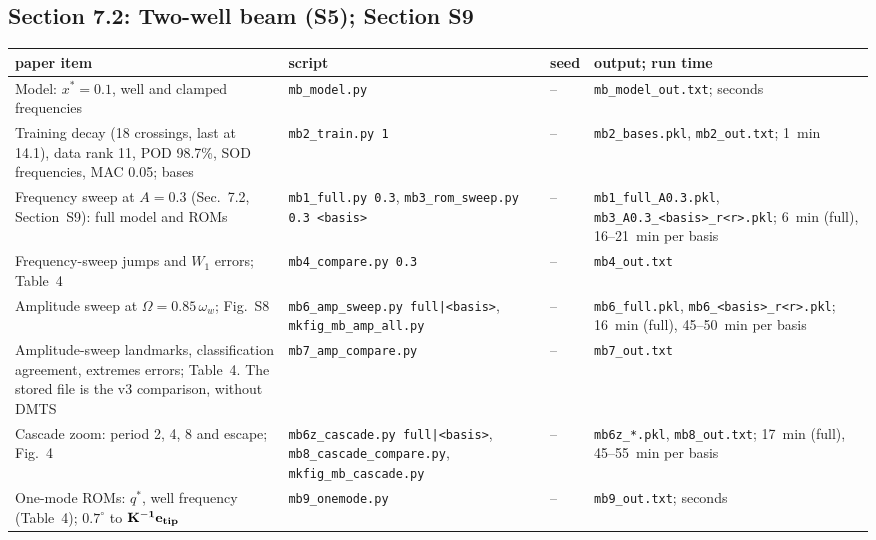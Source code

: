 \documentclass[10pt]{article}
\newcommand{\f}[1]{\texttt{#1}}
\begin{document}
\subsection*{Section 7.2: Two-well beam (S5); Section S9}
\begin{longtable}{L{0.31\textwidth}L{0.25\textwidth}L{0.08\textwidth}L{0.25\textwidth}}
\toprule
paper item & script & seed & output; run time\\ \midrule
Model: $x^*=0.1$, well and clamped frequencies & \f{mb\_\allowbreak{}model.py} & -- & \f{mb\_\allowbreak{}model\_\allowbreak{}out.txt}; seconds\\
Training decay (18 crossings, last at 14.1), data rank 11, POD 98.7\%, SOD frequencies, MAC 0.05; bases & \f{mb2\_\allowbreak{}train.py 1} & -- & \f{mb2\_\allowbreak{}bases.pkl}, \f{mb2\_\allowbreak{}out.txt}; 1~min\\
Frequency sweep at $A=0.3$ (Sec.~7.2, Section~S9): full model and ROMs & \f{mb1\_\allowbreak{}full.py 0.3}, \f{mb3\_\allowbreak{}rom\_\allowbreak{}sweep.py 0.3 <basis>} & -- & \f{mb1\_\allowbreak{}full\_\allowbreak{}A0.3.pkl}, \f{mb3\_\allowbreak{}A0.3\_\allowbreak{}<basis>\_\allowbreak{}r<r>.pkl}; 6~min (full), 16--21~min per basis\\
Frequency-sweep jumps and $W_1$ errors; Table~4 & \f{mb4\_\allowbreak{}compare.py 0.3} & -- & \f{mb4\_\allowbreak{}out.txt}\\
Amplitude sweep at $\Omega=0.85\,\omega_w$; Fig.~S8 & \f{mb6\_\allowbreak{}amp\_\allowbreak{}sweep.py full|<basis>}, \f{mkfig\_\allowbreak{}mb\_\allowbreak{}amp\_\allowbreak{}all.py} & -- & \f{mb6\_\allowbreak{}full.pkl}, \f{mb6\_\allowbreak{}<basis>\_\allowbreak{}r<r>.pkl}; 16~min (full), 45--50~min per basis\\
Amplitude-sweep landmarks, classification agreement, extremes errors; Table~4. The stored file is the v3 comparison, without DMTS & \f{mb7\_\allowbreak{}amp\_\allowbreak{}compare.py} & -- & \f{mb7\_\allowbreak{}out.txt}\\
Cascade zoom: period 2, 4, 8 and escape; Fig.~4 & \f{mb6z\_\allowbreak{}cascade.py full|<basis>}, \f{mb8\_\allowbreak{}cascade\_\allowbreak{}compare.py}, \f{mkfig\_\allowbreak{}mb\_\allowbreak{}cascade.py} & -- & \f{mb6z\_\allowbreak{}*.pkl}, \f{mb8\_\allowbreak{}out.txt}; 17~min (full), 45--55~min per basis\\
One-mode ROMs: $q^*$, well frequency (Table~4); $0.7^\circ$ to $\bf K^{-1}e_{tip}$ & \f{mb9\_\allowbreak{}onemode.py} & -- & \f{mb9\_\allowbreak{}out.txt}; seconds\\

\end{longtable}
\end{document}
